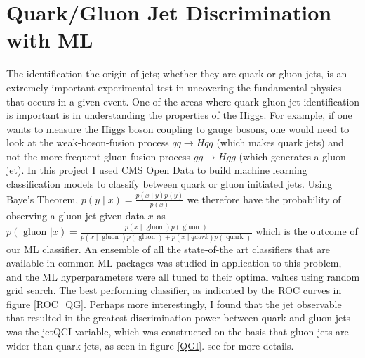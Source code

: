 \section{Quark/Gluon Jet Discrimination with ML}
The identification the origin of jets; whether they are quark or gluon jets, is an extremely important experimental test in uncovering the fundamental physics that occurs in a given event. One of the areas where quark-gluon jet identification is important is in understanding the properties of the Higgs. For example, if one wants to measure the Higgs boson coupling to gauge bosons, one would need to look at the weak-boson-fusion process $qq \rightarrow H qq$ (which makes quark jets) and not the more frequent gluon-fusion process $gg \rightarrow Hgg$ (which generates a gluon jet). In this project I used CMS Open Data to build machine learning classification models to classify between quark or gluon initiated jets. Using Baye's Theorem, $p(y \mid x)=\frac{p(x \mid y) p(y)}{p(x)}$ we therefore have the probability of observing a gluon jet given data $x$ as $p(\text{ gluon } |x) =\frac{p(x \mid \text { gluon }) p(\text { gluon })}{p(x \mid \text { gluon }) p(\text { gluon })+p(x \mid q u a r k) p(\text { quark })} $ which is the outcome of our ML classifier. An ensemble of all the state-of-the art classifiers that are available in common ML packages was studied in application to this problem, and the ML hyperparameters were all tuned to their optimal values using random grid search. The best performing classifier, as indicated by the ROC curves in figure \ref{ROC_QG}. Perhaps more interestingly, I found that the jet observable that resulted in the greatest discrimination power between quark and gluon jets was the jetQCI variable, which was constructed on the basis that gluon jets are wider than quark jets, as seen in figure \ref{QGI}. see \cite{QGI} for more details.

